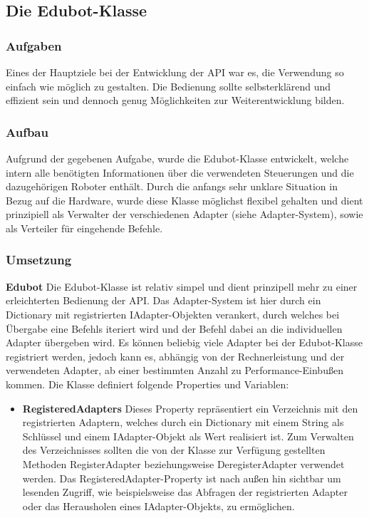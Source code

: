 
\subsection{Die Edubot-Klasse}

\subsubsection{Aufgaben}
Eines der Hauptziele bei der Entwicklung der API war es, die Verwendung so einfach wie möglich zu gestalten. Die Bedienung sollte selbsterklärend und effizient sein und dennoch genug Möglichkeiten zur Weiterentwicklung bilden.

\subsubsection{Aufbau}
Aufgrund der gegebenen Aufgabe, wurde die Edubot-Klasse entwickelt, welche intern alle benötigten Informationen über die verwendeten Steuerungen und die dazugehörigen Roboter enthält. Durch die anfangs sehr unklare Situation in Bezug auf die Hardware, wurde diese Klasse möglichst flexibel gehalten und dient prinzipiell als Verwalter der verschiedenen Adapter (siehe Adapter-System), sowie als Verteiler für eingehende Befehle.\\

\subsubsection{Umsetzung}
\textbf{Edubot}
\newline
Die Edubot-Klasse ist relativ simpel und dient prinzipell mehr zu einer erleichterten Bedienung der API. Das Adapter-System ist hier durch ein Dictionary mit registrierten IAdapter-Objekten verankert, durch welches bei Übergabe eine Befehls iteriert wird und der Befehl dabei an die individuellen Adapter übergeben wird. Es können beliebig viele Adapter bei der Edubot-Klasse registriert werden, jedoch kann es, abhängig von der Rechnerleistung und der verwendeten Adapter, ab einer bestimmten Anzahl zu Performance-Einbußen kommen.
Die Klasse definiert folgende Properties und Variablen:
\begin{itemize}
\item \textbf{RegisteredAdapters}
\newline
Dieses Property repräsentiert ein Verzeichnis mit den registrierten Adaptern, welches durch ein Dictionary mit einem String als Schlüssel und einem IAdapter-Objekt als Wert realisiert ist. Zum Verwalten des Verzeichnisses sollten die von der Klasse zur Verfügung gestellten Methoden RegisterAdapter beziehungsweise DeregisterAdapter verwendet werden. Das RegisteredAdapter-Property ist nach außen hin sichtbar um lesenden Zugriff, wie beispielsweise das Abfragen der registrierten Adapter oder das Herausholen eines IAdapter-Objekts, zu ermöglichen. 
\end{itemize}

